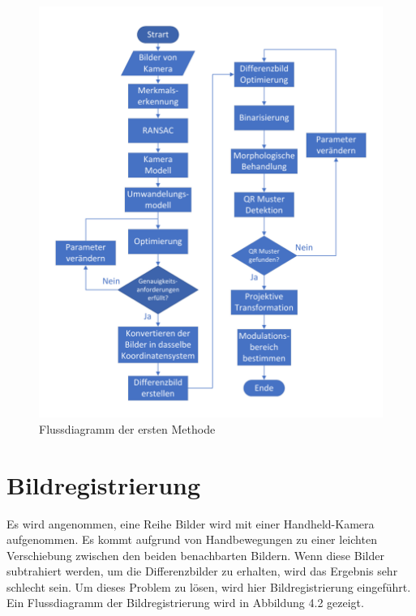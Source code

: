 \begin{figure}[H]
 \centering 
 \includegraphics[keepaspectratio,width=1.0\textwidth]{images/3_Ersteverfahren/Flussdiagrammsum.pdf}
 \caption{Flussdiagramm der ersten Methode}
 \label{fig:Flussdiagramm der Methode}
\end{figure}

\section{Bildregistrierung} 

Es wird angenommen, eine Reihe Bilder wird mit einer Handheld-Kamera aufgenommen. Es kommt aufgrund von Handbewegungen zu einer leichten Verschiebung zwischen den beiden benachbarten Bildern. Wenn diese Bilder subtrahiert werden, um die Differenzbilder zu erhalten, wird das Ergebnis sehr schlecht sein. Um dieses Problem zu lösen, wird hier Bildregistrierung eingeführt. Ein Flussdiagramm der Bildregistrierung wird in Abbildung 4.2 gezeigt. 

